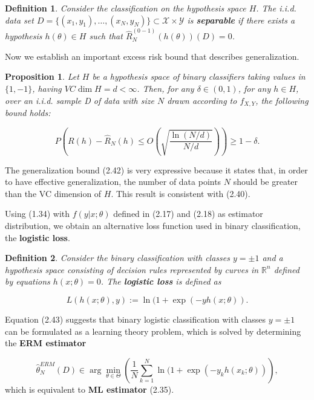 \documentclass{report}
\newtheorem{definition}{Definition}[chapter]
\newtheorem{proposition}{Proposition}[chapter]
\begin{document}
\begin{definition}
Consider the classification on the hypothesis space $H$. The i.i.d. data set $D = \{(x_1,y_1), \dots, (x_N,y_N)\} \subset \mathcal{X} \times \mathcal{Y}$ is \textbf{separable} if there exists a hypothesis $h(\theta) \in H$ such that $\hat{R}^{(0-1)}_N(h(\theta))(D) = 0$.
\end{definition}
Now we establish an important excess risk bound that describes generalization.

\begin{proposition}
Let $H$ be a hypothesis space of binary classifiers taking values in $\{1, -1\}$, having $VC\dim H = d < \infty$. Then, for any $\delta \in (0,1)$, for any $h \in H$, over an i.i.d. sample D of data with size $N$ drawn according to $f_{X,Y}$, the following bound holds:

\begin{equation}
P\left(R(h) - \hat{R}_N(h) \leq O\left(\sqrt{\frac{\ln(N/d)}{N/d}}\right)\right) \geq 1-\delta.
\end{equation}
\end{proposition}
The generalization bound (2.42) is very expressive because it states that, in order to have effective generalization, the number of data points $N$ should be greater than the VC dimension of $H$. This result is consistent with (2.40).

Using (1.34) with $f(y|x;\theta)$ defined in (2.17) and (2.18) as estimator distribution, we obtain an alternative loss function used in binary classification, the \textbf{logistic loss}.

\begin{definition}
Consider the binary classification with classes $y=\pm 1$ and a hypothesis space consisting of decision rules represented by curves in $\mathbb{R}^n$ defined by equations $h(x;\theta) = 0$. The \textbf{logistic loss} is defined as

\begin{equation}
L(h(x;\theta), y) := \ln(1+\exp(-yh(x;\theta)).
\end{equation}
\end{definition}
Equation (2.43) suggests that binary logistic classification with classes $y=\pm 1$ can be formulated as a learning theory problem, which is solved by determining the \textbf{ERM estimator}

\begin{equation}
\hat{\theta}_N^{ERM}(D) \in \arg \min_{\theta \in \Theta}\left(\frac{1}{N}\sum_{k=1}^N \ln(1+\exp(-y_kh(x_k;\theta))\right),
\end{equation}
which is equivalent to \textbf{ML estimator} (2.35).
\end{document}
